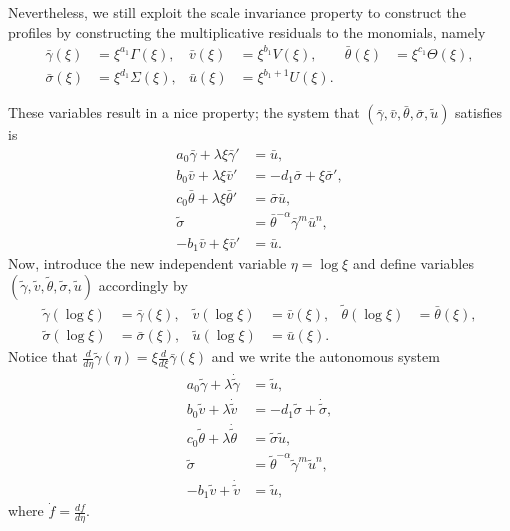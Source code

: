 \documentclass[a4paper,11pt]{article}
\def\bg{{\bar{\gamma}}}
\def\bv{{\bar{v}}}
\def\bth{{\bar{\theta}}}
\def\bs{{\bar{\sigma}}}
\def\bu{{\bar{u}}}
\def\tg{{\tilde{\gamma}}}
\def\tv{{\tilde{v}}}
\def\tth{{\tilde{\theta}}}
\def\ts{{\tilde{\sigma}}}
\def\tu{{\tilde{u}}}
\def\dtg{{\dot{\tilde{\gamma}}}}
\def\dtv{{\dot{\tilde{v}}}}
\def\dtth{{\dot{\tilde{\theta}}}}
\def\dts{{\dot{\tilde{\sigma}}}}
\begin{document}
Nevertheless, we still exploit the scale invariance property to construct the profiles by constructing the multiplicative residuals to the monomials, namely
\begin{equation} \label{eq:CAPtoBAR}
\begin{aligned}
 \bg(\xi)&=\xi^{a_1}\Gamma(\xi), &
 \bv(\xi)&=\xi^{b_1}V(\xi), &
 \bth(\xi)&=\xi^{c_1}\Theta(\xi), \\
 \bs(\xi)&=\xi^{d_1}\Sigma(\xi), &
 \bu(\xi)&=\xi^{b_1+1}U(\xi).
\end{aligned}
\end{equation}

These variables result in a nice property; the system that $(\bg,\bv,\bth,\bs,\tu)$ satisfies is
\begin{equation} \label{eq:barsys}
 \begin{aligned}
  a_0\bg + \lambda\xi\bg' &=\bu,\\
  b_0\bv + \lambda\xi\bv' &=-d_1 \bs + \xi\bs',\\
  c_0\bth+ \lambda\xi\bth'&=\bs\bu,\\
  \ts &=\bth^{-\alpha}\bg^m\bu^n,\\
  -b_1\bv+\xi\bv' &= \bu.
 \end{aligned}
\end{equation}
Now, introduce the new independent variable $\eta = \log\xi$ and define variables $(\tg,\tv,\tth,\ts,\tu)$ accordingly by
\begin{equation} \label{eq:BARtoTIL}
\begin{aligned}
 \tg(\log\xi)&=\bg(\xi), &
 \tv(\log\xi)&=\bv(\xi), &
 \tth(\log\xi)&=\bth(\xi), \\
 \ts(\log\xi)&=\bs(\xi), &
 \tu(\log\xi)&=\bu(\xi).
\end{aligned}
\end{equation}
Notice that $\frac{d}{d\eta}\tg(\eta) = \xi \frac{d}{d\xi}\bg(\xi)$ and we write the autonomous system
\begin{equation} \label{eq:tildesys}
 \begin{aligned}
  a_0\tg + \lambda\dtg &=\tu,\\
  b_0\tv + \lambda\dtv &=-d_1 \ts + \dts,\\
  c_0\tth+ \lambda\dtth&=\ts\tu,\\
  \ts &=\tth^{-\alpha}\tg^m\tu^n,\\
  -b_1\tv+\dtv &= \tu,
 \end{aligned}
\end{equation}
where $\dot{f}=\frac{df}{d\eta}$.
\end{document}
